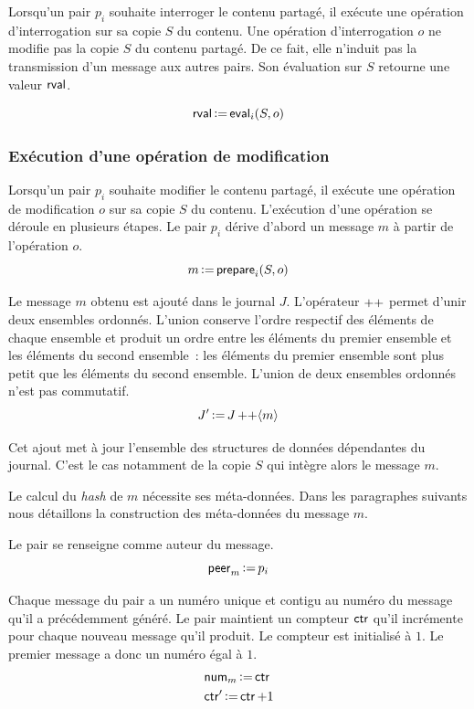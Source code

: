 Lorsqu'un pair $p_i$ souhaite interroger le contenu partagé, il exécute une opération d'interrogation sur sa copie $S$ du contenu.
Une opération d'interrogation $o$ ne modifie pas la copie $S$ du contenu partagé.
De ce fait, elle n'induit pas la transmission d'un message aux autres pairs.
Son évaluation sur $S$ retourne une valeur $\operatorname{\mathsf{rval}}$.

\begin{equation*}
    \operatorname{\mathsf{rval}} \operatorname{\vcentcolon=} \operatorname{\mathsf{eval}}_i(S, o)
\end{equation*}


\subsubsection{Exécution d'une opération de modification}

Lorsqu'un pair $p_i$ souhaite modifier le contenu partagé, il exécute une opération de modification $o$ sur sa copie $S$ du contenu.
L'exécution d'une opération se déroule en plusieurs étapes.
Le pair $p_i$ dérive d'abord un message $m$ à partir de l'opération $o$.
%
\begin{equation*}
    m \operatorname{\vcentcolon=} \operatorname{\mathsf{prepare}}_i(S, o)
\end{equation*}

Le message $m$ obtenu est ajouté dans le journal $J$.
L'opérateur $\operatorname{\mathsf{\operatorname{++}}}$ permet d'unir deux ensembles ordonnés.
L'union conserve l'ordre respectif des éléments de chaque ensemble et produit un ordre entre les éléments du premier ensemble et les éléments du second ensemble~: les éléments du premier ensemble sont plus petit que les éléments du second ensemble.
L'union de deux ensembles ordonnés n'est pas commutatif.
%
\begin{equation*}
    J' \assign J \lappend \tuple*{m}
\end{equation*}

Cet ajout met à jour l'ensemble des structures de données dépendantes du journal.
C'est le cas notamment de la copie $S$ qui intègre alors le message $m$.

Le calcul du \emph{hash} de $m$ nécessite ses méta-données.
Dans les paragraphes suivants nous détaillons la construction des méta-données du message $m$.

Le pair se renseigne comme auteur du message.
%
\begin{equation*}
    \operatorname{\mathsf{peer}}_m \operatorname{\vcentcolon=} p_i
\end{equation*}

Chaque message du pair a un numéro unique et contigu au numéro du message qu'il a précédemment généré.
Le pair maintient un compteur $\operatorname{\mathsf{ctr}}$ qu'il incrémente pour chaque nouveau message qu'il produit.
Le compteur est initialisé à $1$.
Le premier message a donc un numéro égal à $1$.
%
\begin{align*}
    &\operatorname{\mathsf{num}}_m \operatorname{\vcentcolon=} \operatorname{\mathsf{ctr}}\\
    &\operatorname{\mathsf{ctr}}' \operatorname{\vcentcolon=} \operatorname{\mathsf{ctr}} + 1
\end{align*}

